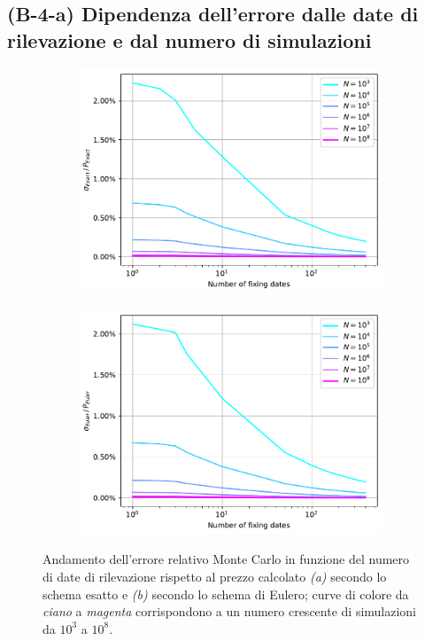 \subsection{(B-4-a) Dipendenza dell'errore dalle date di rilevazione e dal numero di simulazioni} \label{sec:error_vs_m_and_N}

\begin{figure}[t]
\centering
\begin{subfigure}{.5\textwidth}
  \centering
  \includegraphics[scale=0.5]{graphs/OptionPriceVsM_ExactErrorVsM_WithDifferentNs.pdf}
  \caption{}
  \label{fig:exact_error_M}
\end{subfigure}%
\begin{subfigure}{.5\textwidth}
  \centering
  \includegraphics[scale=0.5]{graphs/OptionPriceVsM_EulerErrorVsM_WithDifferentNs.pdf}
  \caption{}
  \label{fig:euler_error_M}
\end{subfigure}
\caption{Andamento dell'errore relativo Monte Carlo in funzione del numero di date di rilevazione rispetto al prezzo calcolato \textit{(a)} secondo lo schema esatto e \textit{(b)} secondo lo schema di Eulero; curve di colore da \textit{ciano} a \textit{magenta} corrispondono a un numero crescente di simulazioni da ${10}^3$ a ${10}^8$.}
\end{figure}


